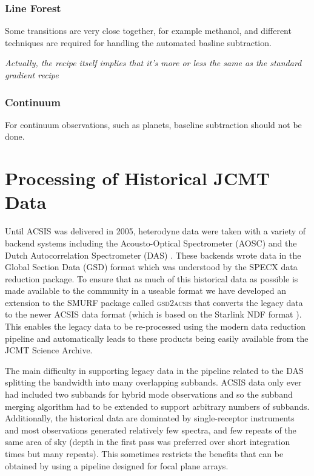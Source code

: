 \documentclass[final,authoryear,5p,times,twocolumn]{elsarticle}
\begin{document}
\subsubsection{Line Forest}

Some transitions are very close together, for example methanol, and
different techniques are required for handling the automated basline
subtraction.

\textit{Actually, the recipe itself implies that it's more or less the
  same as the standard gradient recipe}

\subsubsection{Continuum}

For continuum observations, such as planets, baseline subtraction
should not be done.

\section{Processing of Historical JCMT Data}

Until ACSIS was delivered in 2005, heterodyne data were taken with a
variety of backend systems including the Acousto-Optical Spectrometer
(AOSC) and the Dutch Autocorrelation Spectrometer (DAS)
\citep{1986SPIE..598..134B}. These backends wrote data in the
Global Section Data (GSD) format \citep[e.g.][]{GSD1999} which was
understood by the SPECX data reduction package. To ensure that as much
of this historical data as possible is made available to the community
in a useable format we have developed an extension to the SMURF
package called \textsc{gsd2acsis} that converts the legacy data to the
newer ACSIS data format (which is based on the Starlink NDF format
\citep{NDF,1988STARB...2...11C,P91_adassxxiii}). This enables the legacy data to be re-processed using
the modern data reduction pipeline and automatically leads to these
products being easily available from the JCMT Science Archive.

The main difficulty in supporting legacy data in the pipeline related
to the DAS splitting the bandwidth into many overlapping
subbands. ACSIS data only ever had included two subbands for hybrid
mode observations and so the subband merging algorithm had to be
extended to support arbitrary numbers of subbands. Additionally, the
historical data are dominated by single-receptor instruments and most
observations generated relatively few spectra, and few repeats of the
same area of sky (depth in the first pass was preferred over short
integration times but many repeats). This sometimes
restricts the benefits that can be obtained by using a pipeline
designed for focal plane arrays.
\end{document}
